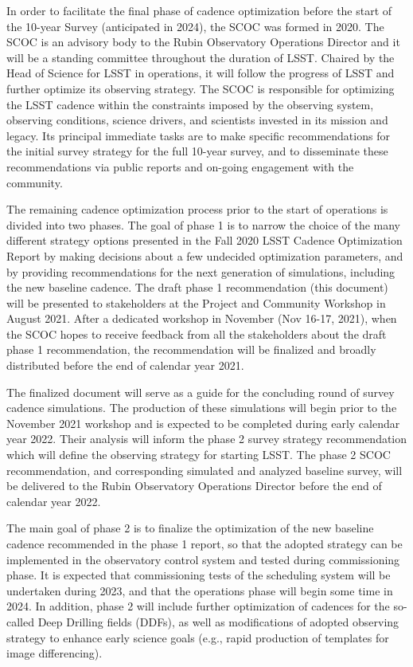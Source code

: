 In order to facilitate the final phase of cadence optimization before the start of the 10-year Survey (anticipated in 2024), the SCOC was formed in 2020. The SCOC is an advisory body to the Rubin Observatory Operations Director and it will be a standing committee throughout the duration of LSST. Chaired by the Head of Science for LSST in operations, it will follow the progress of LSST and further optimize its observing strategy. The SCOC is responsible for optimizing the LSST cadence within the constraints imposed by the observing system, observing conditions, science drivers, and scientists invested in its mission and legacy. Its principal immediate tasks are to make specific recommendations for the initial survey strategy for the full 10-year survey, and to disseminate these recommendations via public reports and on-going engagement with the community. 

The remaining cadence optimization process prior to the start of operations is divided into two phases. The goal of phase 1 is to narrow the choice of the many different strategy options presented in the Fall 2020 LSST Cadence Optimization Report by making decisions about a few undecided optimization parameters, and by providing recommendations for the next generation of simulations, including the new baseline cadence. The draft phase 1 recommendation (this document) will be presented to stakeholders at the Project and Community Workshop in August 2021. After a dedicated workshop in November (Nov 16-17, 2021), when the SCOC hopes to receive feedback from all the stakeholders about the draft phase 1 recommendation, the recommendation will be finalized and broadly distributed before the end of calendar year 2021. 

The finalized document will serve as a guide for the concluding round of survey cadence simulations. The production of these simulations will begin prior to the November 2021 workshop and is expected to be completed during early calendar year 2022. Their analysis will inform the phase 2 survey strategy recommendation which will define the observing strategy for starting LSST. The phase 2 SCOC recommendation, and corresponding simulated and analyzed baseline survey, will be delivered to the Rubin Observatory Operations Director before the end of calendar year 2022. 

The main goal of phase 2 is to finalize the optimization of the new baseline cadence recommended in the phase 1 report, so that the adopted strategy can be implemented in the observatory  control system and tested during commissioning phase. It is expected that commissioning tests of the scheduling system will be undertaken during 2023, and that the operations phase will begin some time in 2024. In addition, phase 2 will include further optimization of cadences for the so-called Deep Drilling fields (DDFs), as well as modifications of adopted observing strategy to enhance early science goals (e.g., rapid production of templates for image differencing). 


